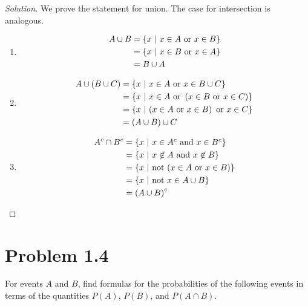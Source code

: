 \documentclass[12pt,letterpaper,reqno]{amsart}
\numberwithin{equation}{subsection}
\begin{document}
\begin{proof}[Solution] We prove the statement for union. The case for intersection is analogous.
\begin{enumerate}[label=(\alph*),leftmargin=*]
    \item
    
    \begin{align*}
        A \cup B &= \left\{ {x} \ \middle| \ {\mbox{$x \in A$ or $x \in B$}} \right\} \\
                 &= \left\{ {x} \ \middle| \ {\mbox{$x \in B$ or $x \in A$}} \right\} \\
                 &= B \cup A
    \end{align*}
    
    \item
    
    \begin{align*}
        A \cup (B \cup C) &= \left\{ {x} \ \middle| \ {\mbox{$x \in A$ or $x \in B \cup C$}} \right\} \\
                          &= \left\{ {x} \ \middle| \ {x \in A \ \mbox{or} \ \left(x \in B \ \mbox{or} \ x \in C \right)} \right\} \\
                          &= \left\{ {x} \ \middle| \ {\left( x \in A \ \mbox{or} \ x \in B \right) \ \mbox{or} \ x \in C} \right\} \\
                          &= (A \cup B) \cup C
    \end{align*}
    
    \item
    
    \begin{align*}
        A^c \cap B^c &= \SET{x}{\mbox{$x \in A^c$ and $x \in B^c$}} \\
                     &= \SET{x}{\mbox{$x \not\in A$ and $x \not\in B$}} \\
                     &= \SET{x}{\mbox{not $\left( x \in A \ \mbox{or} \ x \in B \right)$}} \\
                     &= \SET{x}{\mbox{not $x \in A \cup B$}} \\
                     &= \left(A \cup B \right)^c
    \end{align*}
\end{enumerate}
\end{proof}

\newpage
\section{Problem 1.4}

For events $A$ and $B$, find formulas for the probabilities of the following events in terms of the quantities $P(A)$, $P(B)$, and $P(A \cap B)$.
\end{document}
